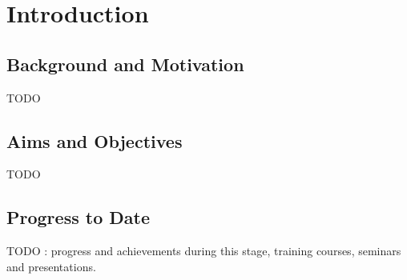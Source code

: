 \chapter{Introduction}

\section{Background and Motivation}

TODO

\section{Aims and Objectives}

TODO
\section{Progress to Date}

TODO : progress and achievements during this stage, training courses, seminars and presentations.
